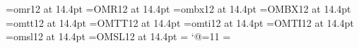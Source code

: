 \font\fourteenrm=omr12 at 14.4pt
\font\FOURTEENRM=OMR12 at 14.4pt
\font\fourteenbx=ombx12 at 14.4pt
\font\FOURTEENBX=OMBX12 at 14.4pt
\font\fourteentt=omtt12 at 14.4pt
\font\FOURTEENTT=OMTT12 at 14.4pt
\font\fourteenit=omti12 at 14.4pt
\font\FOURTEENIT=OMTI12 at 14.4pt
\font\fourteensl=omsl12 at 14.4pt
\font\FOURTEENSL=OMSL12 at 14.4pt
\setbox\strutbox=\hbox{\vrule height12.24pt depth5.04pt width0pt}
{\catcode`@=11 \gdef\raggedbottom{\topskip 14.4pt plus86.4pt \r@ggedbottomtrue}}
\topskip=14.4pt
\normalbaselineskip=17.28pt
\normalbaselines
\def\makeheadline{\vbox to 0pt{\vskip-32.4pt
  \line{\vbox to12.24pt{}\the\headline}\vss}
  \nointerlineskip}
\def\makefootline{\baselineskip=34.56pt
  \lineskiplimit=0pt
  \line{\the\footline}}
\footline={\hss\fourteenrm\folio\hss}
\def\rm{\fourteenrm}
\def\bf{\fourteenbx}
\def\tt{\fourteentt}
\def\it{\fourteenit}
\def\sl{\fourteensl}
\rm
